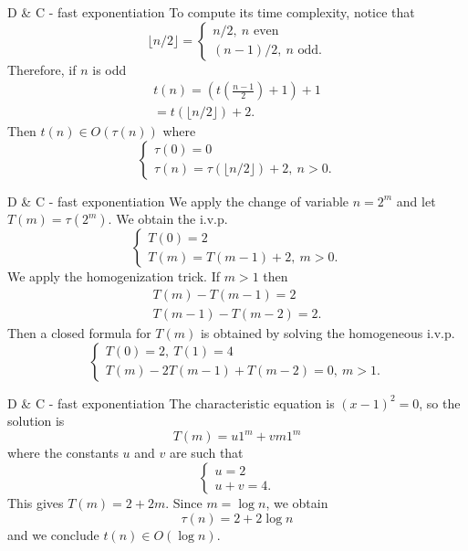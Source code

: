 \documentclass{beamer}
\begin{document}
%

\begin{frame}{D \& C - fast exponentiation}
	To compute its time complexity, notice that
	\[
		\lfloor n/2 \rfloor =
		\begin{cases}
			n/2,\ n \text{ even}\\
			(n-1)/2,\ n \text{ odd}.
		\end{cases}
	\]
	Therefore, if $n$ is odd
	\[
		\begin{array}{c}
			t(n) = \left( t\left( \frac{n-1}{2} \right) + 1 \right) + 1\\
			= t(\lfloor n/2 \rfloor) + 2.
		\end{array}
	\]
	Then $t(n) \in O(\tau(n))$ where
	\[
		\begin{cases}
			\tau(0)= 0\\
			\tau(n)= \tau(\lfloor n/2 \rfloor) + 2,\ n > 0.
		\end{cases}
	\]
\end{frame}

%

\begin{frame}{D \& C - fast exponentiation}
	We apply the change of variable $n= 2^m$ and let $T(m)= \tau(2^m)$. We
	obtain the i.v.p.
	\[
		\begin{cases}
			T(0)= 2\\
			T(m)= T(m-1) + 2,\ m > 0.
		\end{cases}
	\]
	We apply the homogenization trick. If $m > 1$ then
	\[
		\begin{array}{c}
			T(m) - T(m-1) = 2\\
			T(m-1) - T(m-2) = 2.
		\end{array}
	\]
	Then a closed formula for $T(m)$ is obtained by solving the homogeneous i.v.p.
	\[
		\begin{cases}
			T(0)= 2,\ T(1) = 4\\
			T(m) - 2T(m-1) + T(m-2)= 0,\ m > 1.
		\end{cases}
	\]
\end{frame}

%

\begin{frame}{D \& C - fast exponentiation}
	The characteristic equation is $(x - 1)^2= 0$, so the solution is
	\[
		T(m) = u1^m + vm1^m
	\]
	where the constants $u$ and $v$ are such that
	\[
		\begin{cases}
			u = 2\\
			u + v = 4.
		\end{cases}
	\]
	This gives $T(m) = 2 + 2m$. Since $m = \log n$, we obtain
	\[
		\tau(n) = 2 + 2\log n
	\]
	and we conclude $t(n) \in O(\log n)$.
\end{frame}
\end{document}
